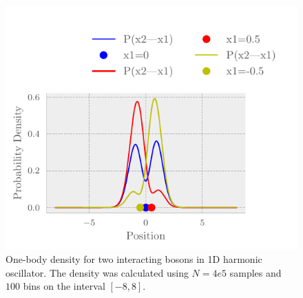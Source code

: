 \begin{figure}[H]
	\includegraphics[]{figures/many_part_con2.pdf}
	\caption{One-body density for two interacting bosons in 1D harmonic oscillator. The density was calculated using $N=4e5$ samples and $100$ bins on the interval $[-8,8]$.}
	\label{fig:many_part_con2.pdf}
\end{figure}



 




\subsection{}




